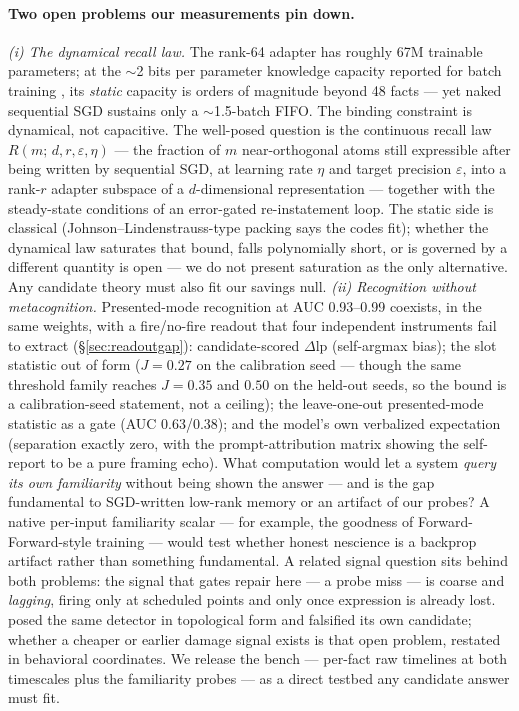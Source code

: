 \documentclass[11pt]{article}
\newcommand{\dlp}{\Delta\mathrm{lp}}
\begin{document}
\paragraph{Two open problems our measurements pin down.}\label{sec:openproblem}
\emph{(i) The dynamical recall law.} The rank-64 adapter has roughly 67M trainable parameters;
at the $\sim$2 bits per parameter knowledge capacity reported for batch training
\citep{allenzhu2024capacity}, its \emph{static} capacity is orders of magnitude beyond 48 facts
--- yet naked sequential SGD sustains only a $\sim$1.5-batch FIFO. The binding constraint is
dynamical, not capacitive. The well-posed question is the continuous recall law $R(m;\, d, r,
\varepsilon, \eta)$ --- the fraction of $m$ near-orthogonal atoms still expressible after being
written by sequential SGD, at learning rate $\eta$ and target precision $\varepsilon$, into a
rank-$r$ adapter subspace of a $d$-dimensional representation --- together with the steady-state
conditions of an error-gated re-instatement loop. The static side is classical
(Johnson--Lindenstrauss-type packing says the codes fit); whether the dynamical law saturates
that bound, falls polynomially short, or is governed by a different quantity is open --- we do
not present saturation as the only alternative. Any candidate theory must also fit our savings
null. \emph{(ii) Recognition without metacognition.} Presented-mode recognition at AUC
0.93--0.99 coexists, in the same weights, with a fire/no-fire readout that four independent
instruments fail to extract (\S\ref{sec:readoutgap}): candidate-scored $\dlp$ (self-argmax
bias); the slot statistic out of form ($J = 0.27$ on the calibration seed --- though the same
threshold family reaches $J = 0.35$ and $0.50$ on the held-out seeds, so the bound is a
calibration-seed statement, not a ceiling); the leave-one-out presented-mode statistic as a
gate (AUC 0.63/0.38); and the model's own verbalized expectation (separation exactly zero,
with the prompt-attribution matrix showing the self-report to be a pure framing echo). What
computation would let a system \emph{query its own familiarity} without being shown the answer
--- and is the gap fundamental to SGD-written low-rank memory or an artifact of our probes? A
native per-input familiarity scalar --- for example, the goodness of Forward-Forward-style
training \citep{hinton2022ff} --- would test whether honest nescience is a backprop artifact
rather than something fundamental. A related signal question sits behind both problems: the
signal that gates repair here --- a probe miss --- is coarse and \emph{lagging}, firing only at
scheduled points and only once expression is already lost. \citet{lin2026mathlife} posed the
same detector in topological form and falsified its own candidate; whether a cheaper or earlier
damage signal exists is that open problem, restated in behavioral coordinates. We
release the bench --- per-fact raw timelines at both timescales plus the familiarity probes ---
as a direct testbed any candidate answer must fit.
\end{document}
